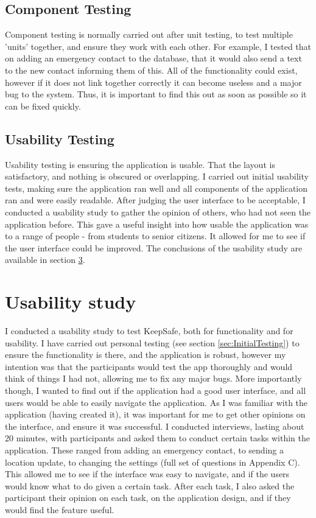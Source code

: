 \documentclass[a4paper]{report}
\begin{document}
\section{Component Testing} 
Component testing is normally carried out after unit testing, to test multiple 'units' together, and ensure they work with each other. For example, I tested that on adding an emergency contact to the database, that it would also send a text to the new contact informing them of this. All of the functionality could exist, however if it does not link together correctly it can become useless and a major bug to the system. Thus, it is important to find this out as soon as possible so it can be fixed quickly. 
\section{Usability Testing} 
Usability testing is ensuring the application is usable. That the layout is satisfactory, and nothing is obscured or overlapping. I carried out initial usability tests, making sure the application ran well and all components of the application ran and were easily readable. After judging the user interface to be acceptable, I conducted a usability study to gather the opinion of others, who had not seen the application before. This gave a useful insight into how usable the application was to a range of people - from students to senior citizens. It allowed for me to see if the user interface could be improved. The conclusions of the usability study are available in section \ref{sec:Usability}. 

\chapter{Usability study} 
\label{sec:Usability}
I conducted a usability study to test KeepSafe, both for functionality and for usability. I have carried out personal testing (see section \ref{sec:InitialTesting}) to ensure the functionality is there, and the application is robust, however my intention was that the participants would test the app thoroughly and would think of things I had not, allowing me to fix any major bugs. More importantly though, I wanted to find out if the application had a good user interface, and all users would be able to easily navigate the application. As I was familiar with the application (having created it), it was important for me to get other opinions on the interface, and ensure it was successful. I conducted interviews, lasting about 20 minutes, with participants and asked them to conduct certain tasks within the application. These ranged from adding an emergency contact, to sending a location update, to changing the settings (full set of questions in Appendix C). This allowed me to see if the interface was easy to navigate, and if the users would know what to do given a certain task. After each task, I also asked the participant their opinion on each task, on the application design, and if they would find the feature useful. 
\newpage
 

\newpage
\appendix
\end{document}
